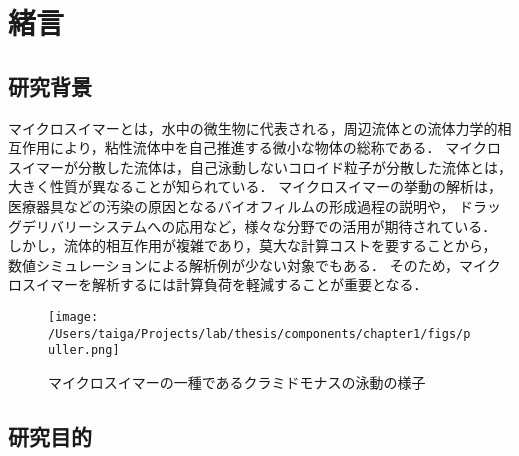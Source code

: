 \documentclass[11pt, a4j, dvipdfmx]{jarticle}
\begin{document}
\section{緒言}
\label{sec:introduction}


\subsection{研究背景}
\par
マイクロスイマーとは，水中の微生物に代表される，周辺流体との流体力学的相互作用により，粘性流体中を自己推進する微小な物体の総称である．
マイクロスイマーが分散した流体は，自己泳動しないコロイド粒子が分散した流体とは，大きく性質が異なることが知られている．
マイクロスイマーの挙動の解析は，医療器具などの汚染の原因となるバイオフィルムの形成過程の説明や，
ドラッグデリバリーシステムへの応用など，様々な分野での活用が期待されている．
しかし，流体的相互作用が複雑であり，莫大な計算コストを要することから，
数値シミュレーションによる解析例が少ない対象でもある．
そのため，マイクロスイマーを解析するには計算負荷を軽減することが重要となる．
    \begin{figure}[htbp]
        \centering
        \texttt{[image: /Users/taiga/Projects/lab/thesis/components/chapter1/figs/puller.png]}
        \caption{マイクロスイマーの一種であるクラミドモナスの泳動の様子\cite{Chlamydomonas}}
    \end{figure}


\subsection{研究目的}
\label{sec:purpose}
\end{document}
